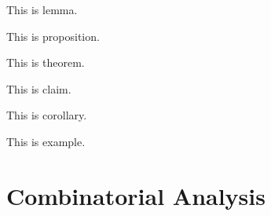 \documentclass{huhtakm-template-book}
\begin{document}
\begin{lem}
	This is lemma.
\end{lem}
\begin{prop}
	This is proposition.
\end{prop}
\begin{thm}
	This is theorem.
\end{thm}
\begin{cla}
	This is claim.
\end{cla}
\begin{cor}
	This is corollary.
\end{cor}
\begin{eg}
	This is example.
\end{eg}
\tableofcontents
\chapter{Combinatorial Analysis}
\end{document}

